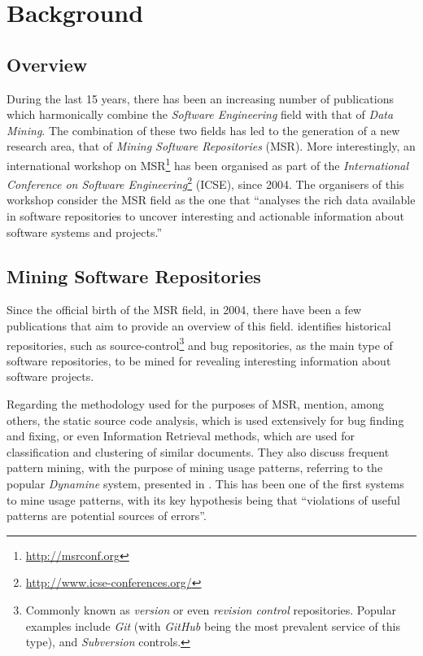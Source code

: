 \chapter{Background}
\label{chap:background}


\section{Overview}
\label{sec:overview}

During the last 15 years, there has been an increasing number of publications which harmonically combine the \textit{Software Engineering} field with that of \textit{Data Mining}. The combination of these two fields has led to the generation of a new research area, that of \textit{Mining Software Repositories} (MSR). More interestingly, an international workshop on MSR\footnote{\url{http://msrconf.org}} has been organised as part of the \textit{International Conference on Software Engineering}\footnote{\url{http://www.icse-conferences.org/}} (ICSE), since 2004. The organisers of this workshop consider the MSR field as the one that ``analyses the rich data available in software repositories to uncover interesting and actionable information about software systems and projects.''


\section{Mining Software Repositories}
\label{sec:msr}

Since the official birth of the MSR field, in 2004, there have been a few publications that aim to provide an overview of this field.  \cite{Hassan:2008} identifies historical repositories, such as source-control\footnote{Commonly known as \textit{version} or even \textit{revision control} repositories. Popular examples include \textit{Git} (with \textit{GitHub} being the most prevalent service of this type), and \textit{Subversion} controls.} and bug repositories, as the main type of software repositories, to be mined for revealing interesting information about software projects.

Regarding the methodology used for the purposes of MSR,  mention, among others, the static source code analysis, which is used extensively for bug finding and fixing, or even Information Retrieval methods, which are used for classification and clustering of similar documents. They also discuss frequent pattern mining, with the purpose of mining usage patterns, referring to the popular \textit{Dynamine} system, presented in \cite{Livshits:2005}. This has been one of the first systems to mine usage patterns, with its key hypothesis being that ``violations of useful patterns are potential sources of errors''. 

